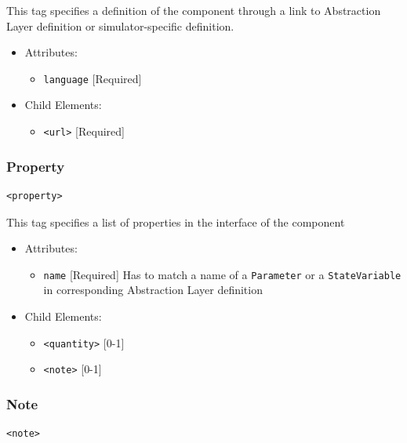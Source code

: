 \documentclass{article}
\begin{document}
This tag specifies a definition of the component through a link to Abstraction
Layer definition or simulator-specific definition.

\begin{itemize}
\item Attributes:
%
\begin{itemize}
\item \verb|language| {[}Required{]}
\end{itemize}

\item Child Elements:
%
\begin{itemize}
\item \verb|<url>| {[}Required{]}
\end{itemize}

\end{itemize}

\subsubsection{Property}
%
\begin{lstlisting}
<property>
\end{lstlisting}

This tag specifies a list of properties in the interface of the component

\begin{itemize}
\item Attributes:
%
\begin{itemize}
\item \verb|name| {[}Required{]} Has to match a name of a {\tt Parameter}
or a {\tt StateVariable} in corresponding Abstraction Layer definition
\end{itemize}

\item Child Elements:
%
\begin{itemize}
\item \verb|<quantity>| {[}0-1{]}
\item \verb|<note>| {[}0-1{]}
\end{itemize}

\end{itemize}

\subsubsection{Note}
%
\begin{lstlisting}
<note>
\end{lstlisting}
\end{document}

